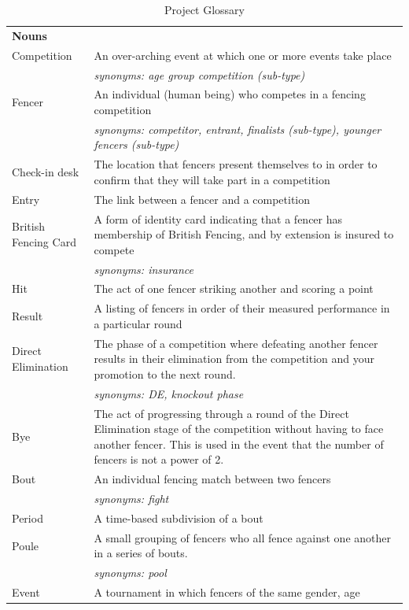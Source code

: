 \begin{center}
\begin{longtable}[l]{| p{} | p{} |} 
 \caption{\label{tab:ProjectGlossary}Project Glossary}
 \hline
 \textbf{Nouns} & \\ 
 Competition & An over-arching event at which one or more events
 take place \\
 & \textit{synonyms: age group competition (sub-type)} \\ 
 Fencer & An individual (human being) who competes in a fencing
 competition \\
 & \textit{synonyms: competitor, entrant, finalists (sub-type),
 younger fencers (sub-type)} \\
 Check-in desk & The location that fencers present themselves to
 in order to confirm that they will take part in a competition \\
 Entry & The link between a fencer and a competition \\
 British Fencing Card & A form of identity card indicating that a
 fencer has membership of British Fencing, and by extension is insured to
 compete \\
 & \textit{synonyms: insurance} \\
 Hit & The act of one fencer striking another and scoring a point \\
 Result & A listing of fencers in order of their measured performance in a 
 particular round \\
 Direct Elimination & The phase of a competition where defeating
 another fencer results in their elimination from the competition and your
 promotion to the next round. \\
 & \textit{synonyms: DE, knockout phase} \\
 Bye & The act of progressing through a round of the Direct
 Elimination stage of the competition without having to face another fencer.
 This is used in the event that the number of fencers is not a power of 2. \\
 Bout & An individual fencing match between two fencers \\
 & \textit{synonyms: fight} \\
 Period & A time-based subdivision of a bout \\
 Poule & A small grouping of fencers who all fence against one
 another in a series of bouts. \\
 & \textit{synonyms: pool} \\ 
 Event & A tournament in which fencers of the same gender, age

\end{longtable}
\end{center}

